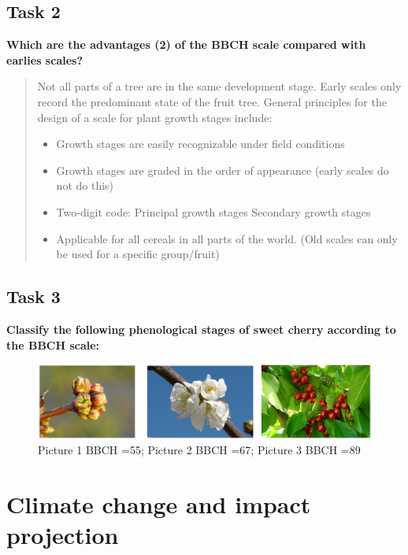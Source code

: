 \documentclass[
]{book}
\begin{document}
\hypertarget{task-2}{%
\section{Task 2}\label{task-2}}

\textbf{Which are the advantages (2) of the BBCH scale compared with earlies scales?}

\begin{quote}
Not all parts of a tree are in the same development stage. Early scales only record the predominant state of the fruit tree. General principles for the design of a scale for plant growth stages include:

\begin{itemize}
\item
  Growth stages are easily recognizable under field conditions
\item
  Growth stages are graded in the order of appearance (early scales do not do this)
\item
  Two-digit code: Principal growth stages \textbar{} Secondary growth stages
\item
  Applicable for all cereals in all parts of the world. (Old scales can only be used for a specific group/fruit)
\end{itemize}
\end{quote}

\hypertarget{task-3}{%
\section{Task 3}\label{task-3}}

\textbf{Classify the following phenological stages of sweet cherry according to the BBCH scale:}

\begin{figure}
\centering
\includegraphics{./pheno_stages.png}
\caption{Picture 1 BBCH =55; Picture 2 BBCH =67; Picture 3 BBCH =89}
\end{figure}

\hypertarget{climate-change-and-impact-projection}{%
\chapter{Climate change and impact projection}\label{climate-change-and-impact-projection}}
\end{document}
